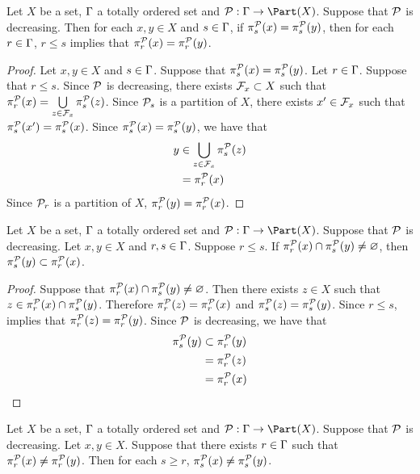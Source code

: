 \documentclass{book}
\begin{document}
\begin{ex}
	Let $X$ be a set, $\Gamma$ a totally ordered set and $\MP: \Gam \rightarrow \Part(X)$. Suppose that $\mathcal{P}$ is decreasing. Then for each $x,y \in X$ and $s \in \Gamma$, if $\pi^{\mathcal{P}}_s(x) = \pi^{\mathcal{P}}_s(y)$, then for each $r \in \Gamma$, $r \leq s$ implies that $\pi^{\mathcal{P}}_r(x) = \pi^{\mathcal{P}}_r(y)$.
\end{ex}

\begin{proof}
	Let $x,y \in X$ and $s \in \Gamma$. Suppose that $\pi^{\mathcal{P}}_s(x) = \pi^{\mathcal{P}}_s(y)$. Let $r \in \Gamma$. Suppose that $r \leq s$. Since $\mathcal{P}$ is decreasing, there exists $\mathcal{F}_x \subset X$ such that $\pi^{\mathcal{P}}_r(x) = \bigcup\limits_{z \in \mathcal{F}_x} \pi^{\mathcal{P}}_s(z)$. Since $\mathcal{P}_s$ is a partition of $X$,  there exists $x' \in \mathcal{F}_x$ such that $\pi^{\mathcal{P}}_s(x') = \pi^{\mathcal{P}}_s(x)$. Since $\pi^{\mathcal{P}}_s(x) = \pi^{\mathcal{P}}_s(y)$, we have that
	\begin{align*}
		 y
		 & \in \bigcup\limits_{z \in \mathcal{F}_x} \pi^{\mathcal{P}}_s(z) \\
		 & = \pi^{\mathcal{P}}_r(x)
	\end{align*}
	Since $\mathcal{P}_r$ is a partition of $X$, $\pi^{\mathcal{P}}_r(y) = \pi^{\mathcal{P}}_r(x)$.
\end{proof}

\begin{ex}
	Let $X$ be a set, $\Gamma$ a totally ordered set and $\MP: \Gam \rightarrow \Part(X)$. Suppose that $\mathcal{P}$ is decreasing. Let $x, y \in X$ and $r,s \in \Gamma$. Suppose $r \leq s$. If $\pi^{\mathcal{P}}_r(x) \cap \pi^{\mathcal{P}}_s(y) \neq \varnothing$, then $\pi^{\mathcal{P}}_s(y) \subset \pi^{\mathcal{P}}_r(x)$.  
\end{ex}

\begin{proof}
	Suppose that $\pi^{\mathcal{P}}_r(x) \cap \pi^{\mathcal{P}}_s(y) \neq \varnothing$. Then there exists $z \in X$ such that $z \in \pi^{\mathcal{P}}_r(x) \cap \pi^{\mathcal{P}}_s(y)$. Therefore $\pi^{\mathcal{P}}_r(z) = \pi^{\mathcal{P}}_r(x)$ and $\pi^{\mathcal{P}}_s(z) = \pi^{\mathcal{P}}_s(y)$. Since $r \leq s$,  implies that $\pi^{\mathcal{P}}_r(z) = \pi^{\mathcal{P}}_r(y)$. Since $\mathcal{P}$ is decreasing, we have that
	\begin{align*}
		\pi^{\mathcal{P}}_s(y)
		& \subset \pi^{\mathcal{P}}_r(y) \\
		& = \pi^{\mathcal{P}}_r(z) \\
		& = \pi^{\mathcal{P}}_r(x) 
	\end{align*}
\end{proof}

\begin{ex}
	Let $X$ be a set, $\Gamma$ a totally ordered set and $\MP: \Gam \rightarrow \Part(X)$. Suppose that $\mathcal{P}$ is decreasing. Let $x,y \in X$. Suppose that there exists $r \in \Gamma$ such that $\pi^{\mathcal{P}}_r(x) \neq \pi^{\mathcal{P}}_r(y)$. Then for each $s \geq r$, $\pi^{\mathcal{P}}_s(x) \neq \pi^{\mathcal{P}}_s(y)$.
\end{ex}
\end{document}
